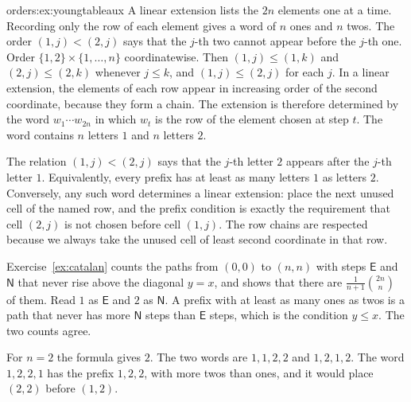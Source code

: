 \begin{solution}{orders:ex:youngtableaux}
\idea A linear extension lists the $2n$ elements one at a time. Recording only the row of each element gives a word of $n$ ones and $n$ twos. The order $(1,j)<(2,j)$ says that the $j$-th two cannot appear before the $j$-th one.
\writeup Order $\{1,2\}\times\{1,\dots,n\}$ coordinatewise. Then $(1,j)\le(1,k)$ and $(2,j)\le(2,k)$ whenever $j\le k$, and $(1,j)\le(2,j)$ for each $j$. In a linear extension, the elements of each row appear in increasing order of the second coordinate, because they form a chain. The extension is therefore determined by the word $w_1\cdots w_{2n}$ in which $w_t$ is the row of the element chosen at step $t$. The word contains $n$ letters $1$ and $n$ letters $2$.

The relation $(1,j)<(2,j)$ says that the $j$-th letter $2$ appears after the $j$-th letter $1$. Equivalently, every prefix has at least as many letters $1$ as letters $2$. Conversely, any such word determines a linear extension: place the next unused cell of the named row, and the prefix condition is exactly the requirement that cell $(2,j)$ is not chosen before cell $(1,j)$. The row chains are respected because we always take the unused cell of least second coordinate in that row.

Exercise~\ref{ex:catalan} counts the paths from $(0,0)$ to $(n,n)$ with steps $\mathsf E$ and $\mathsf N$ that never rise above the diagonal $y=x$, and shows that there are $\frac1{n+1}\binom{2n}n$ of them. Read $1$ as $\mathsf E$ and $2$ as $\mathsf N$. A prefix with at least as many ones as twos is a path that never has more $\mathsf N$ steps than $\mathsf E$ steps, which is the condition $y\le x$. The two counts agree.

For $n=2$ the formula gives $2$. The two words are $1,1,2,2$ and $1,2,1,2$. The word $1,2,2,1$ has the prefix $1,2,2$, with more twos than ones, and it would place $(2,2)$ before $(1,2)$.
\end{solution}

